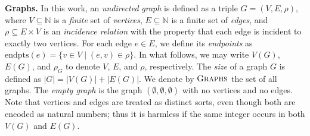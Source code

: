 \documentclass[11pt,a4paper]{article}
\newcommand{\agraph}{G}
\newcommand{\Nplus}{\mathbb{N}_{+}}
\newcommand{\N}{\mathbb{N}}
\newcommand{\vertexset}[1]{V(#1)}
\newcommand{\edgeset}[1]{E(#1)}
\newcommand{\incidencerelationname}{\rho}
\newcommand{\incidencerelation}[1]{\incidencerelationname_{#1}}
\newcommand{\edgeendpointsname}{\mathrm{endpts}}
\newcommand{\anedge}{e}
\newcommand{\avertex}{v}
\newcommand{\defeq}{~\dot{=}~}
\newcommand{\finitepowerset}[1]{\mathcal{P}_{\mathrm{fin}}(#1)}
\newcommand{\powerset}[1]{\mathcal{P}(#1)}
\newcommand{\powersetchoosek}[2]{\mathcal{P}(#1,#2)}
\newcommand{\powersetchoosekleq}[2]{\mathcal{P}_{\leq}(#1,#2)}
\newcommand{\allgraphs}{\textsc{Graphs}}
\newcommand{\vertexsetname}{V}
\newcommand{\edgesetname}{E}
\begin{document}

\par\medskip\noindent\textbf{Graphs.}
In this work, an \emph{undirected} \emph{graph} is defined as a triple
$\agraph = (\vertexsetname, \edgesetname, \incidencerelationname)$,
where $\vertexsetname \subseteq \mathbb{N}$ is a \emph{finite} set of \emph{vertices},
$\edgesetname \subseteq \mathbb{N}$ is a finite set of \emph{edges}, and
$\incidencerelationname \subseteq \edgesetname \times \vertexsetname$ is an \emph{incidence relation}
with the property that each edge is incident to exactly two vertices.
For each edge $\anedge \in \edgesetname$, we define its \emph{endpoints} as $\edgeendpointsname(\anedge) = \{\avertex \in \vertexsetname \mid (\anedge, \avertex) \in \incidencerelationname\}$.
In what follows, we may write $\vertexset{\agraph}$, $\edgeset{\agraph}$, and
$\incidencerelation{\agraph}$ to denote $\vertexsetname$, $\edgesetname$, and
$\incidencerelationname$, respectively. The \emph{size} of a graph $\agraph$ is defined as $|\agraph| = |\vertexset{\agraph}| + |\edgeset{\agraph}|$.
We denote by $\allgraphs$ the set of all graphs. The \emph{empty graph} is the graph
$(\emptyset, \emptyset, \emptyset)$ with no vertices and no edges.
Note that vertices and edges are treated as distinct sorts, even though both are encoded as natural numbers; thus it is harmless if the same integer occurs in both $\vertexset{\agraph}$ and $\edgeset{\agraph}$.
\end{document}
